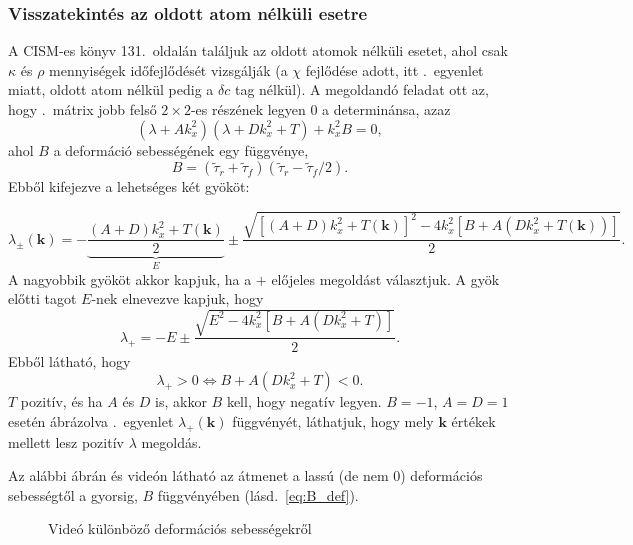 \documentclass[10pt,a4paper]{scrartcl}
\let\mathbf\bm
\begin{document}
\subsubsection{Visszatekintés az oldott atom nélküli esetre}
A CISM-es könyv 131.\ oldalán találjuk az oldott atomok nélküli esetet, ahol csak $\kappa$ és $\rho$ mennyiségek időfejlődését vizsgálják (a $\chi$ fejlődése adott, itt .\ egyenlet miatt, oldott atom nélkül pedig a $\delta c$ tag nélkül). A megoldandó feladat ott az, hogy .\ mátrix jobb felső $2 \times 2$-es részének legyen 0 a determinánsa, azaz
\[\left( {\lambda  + Ak_x^2} \right)\left( {\lambda  + Dk_x^2 + T} \right) + k_x^2B = 0,\]
ahol $B$ a deformáció sebességének egy függvénye,
\begin{equation} \label{eq:B_def}
B = \left( {{{\tilde \tau }_r} + {{\tilde \tau }_f}} \right)\left( {{{\tilde \tau }_r} - {{\tilde \tau }_f}/2} \right).
\end{equation}
Ebből kifejezve a lehetséges két gyököt:

\begin{equation} \label{eq:lambda_k}
{\lambda _ \pm }\left( {\mathbf{k}} \right) =  - \underbrace {\frac{{\left( {A + D} \right)k_x^2 + T\left( {\mathbf{k}} \right)}}{2}}_E \pm \frac{{\sqrt {{{\left[ {\left( {A + D} \right)k_x^2 + T\left( {\mathbf{k}} \right)} \right]}^2} - 4k_x^2\left[ {B  + A\left( {Dk_x^2 + T\left( {\mathbf{k}} \right)} \right)} \right]} }}{2}.
\end{equation}
A nagyobbik gyököt akkor kapjuk, ha a $+$ előjeles megoldást választjuk. A gyök előtti tagot $E$-nek elnevezve kapjuk, hogy
\[{\lambda _ + } =  - E \pm \frac{{\sqrt {{E^2} - 4k_x^2\left[ {B  + A\left( {Dk_x^2 + T} \right)} \right]} }}{2}.\]
Ebből látható, hogy
\[{\lambda _ + } > 0 \Leftrightarrow B  + A\left( {Dk_x^2 + T} \right) < 0.\]
$T$ pozitív, és ha $A$ és $D$ is, akkor $B$ kell, hogy negatív legyen. $B=-1$, $A=D=1$ esetén ábrázolva .\ egyenlet ${\lambda _ + }\left( {\mathbf{k}} \right)$ függvényét, láthatjuk, hogy mely $\mathbf{k}$ értékek mellett lesz pozitív $\lambda$ megoldás.


Az alábbi ábrán és videón látható az átmenet a lassú (de nem 0) deformációs sebességtől a gyorsig, $B$ függvényében (lásd.\ \ref{eq:B_def}).
\begin{figure}[htb]
\centering
{}
\caption{Videó különböző deformációs sebességekről}
\end{figure}
\end{document}
